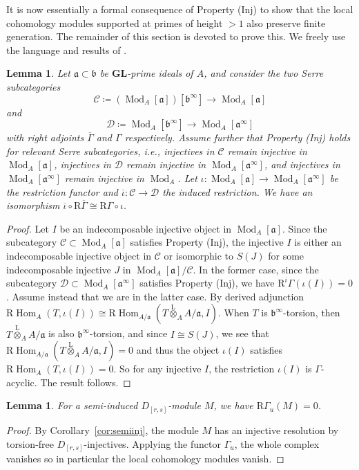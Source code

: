 \documentclass[12pt]{amsart}
\newcommand{\cC}{\mathcal{C}}
\newcommand{\cD}{\mathcal{D}}
\newcommand{\rL}{\mathrm{L}}
\newcommand{\rR}{\mathrm{R}}
\newcommand{\fa}{\mathfrak{a}}
\newcommand{\fb}{\mathfrak{b}}
\DeclareMathOperator{\Hom}{Hom}
\DeclareMathOperator{\Mod}{Mod}
\newcommand{\Drs}{D_{[r,s]}}
\newcommand{\GL}{\mathbf{GL}}
\newcommand{\mGau}{\Gamma_{u}}
\numberwithin{equation}{section}
\newtheorem{lemma}[equation]{Lemma}
\theoremstyle{definition}
\theoremstyle{plain}
\begin{document}
It is now essentially a formal consequence of Property (Inj) to show that the local cohomology modules supported at primes of height $>1$ also preserve finite generation. The remainder of this section is devoted to prove this. We freely use the language and results of \cite[Section~4]{ss19gl2}.
\begin{lemma}\label{lem:restgamma}
    Let $\fa \subset \fb$ be $\GL$-prime ideals of $A$, and consider the two Serre subcategories
    \[  \cC \coloneqq (\Mod_A[\fa])[\fb^{\infty}] \to \Mod_A[\fa] \]
    and
    \[ \cD \coloneqq \Mod_A[\fb^{\infty}] \to \Mod_A[\fa^{\infty}] \] with right adjoints $\overline{\Gamma}$ and $\Gamma$ respectively. Assume further that Property (Inj) holds for relevant Serre subcategories, i.e., injectives in $\cC$ remain injective in $\Mod_A[\fa]$, injectives in $\cD$ remain injective in $\Mod_A[\fa^{\infty}]$, and injectives in $\Mod_A[\fa^{\infty}]$ remain injective in $\Mod_A$. Let $\iota \colon \Mod_A[\fa] \to \Mod_A[\fa^{\infty}]$ be the restriction functor and $\overline\iota \colon \cC \to \cD$ the induced restriction. We have an isomorphism $\overline\iota \circ \rR\overline\Gamma \cong \rR \Gamma \circ \iota$.
\end{lemma}
\begin{proof} 
    Let $I$ be an indecomposable injective object in $\Mod_A[\fa]$. Since the subcategory $\cC \subset \Mod_A[\fa]$ satisfies Property (Inj), the injective $I$ is either an indecomposable injective object in $\cC$ or isomorphic to $S(J)$ for some indecomposable injective $J$ in $\Mod_A[\fa]/\cC$. In the former case, since the subcategory $\cD \subset \Mod_A[\fa^{\infty}]$ satisfies Property (Inj), we have $\rR^i \Gamma(\iota(I)) = 0$. Assume instead that we are in the latter case. By derived adjunction $\rR \Hom_{A}(T, \iota(I)) \cong \rR \Hom_{A/\fa}(T \stackrel{\rL}{\otimes}_A A/\fa, I) $.  When $T$ is $\fb^{\infty}$-torsion, then $T \stackrel{\rL}{\otimes}_A  A/\fa$ is also $\fb^{\infty}$-torsion, and since $I \cong S(J)$, we see that $\rR \Hom_{A/\fa}(T \stackrel{\rL}{\otimes}_A A/\fa, I) = 0$ and thus the object $\iota(I)$ satisfies $\rR\Hom_{A}(T, \iota(I)) = 0$. So for any injective $I$, the restriction $\iota(I)$ is $\Gamma$-acyclic. The result follows.
\end{proof}
\begin{lemma}\label{lem:semilcvan}
   For a semi-induced $\Drs$-module $M$, we have $\rR \mGau(M) = 0$. 
\end{lemma}
\begin{proof}
   By Corollary~\ref{cor:semiinj}, the module $M$ has an injective resolution by torsion-free $\Drs$-injectives. Applying the functor $\mGau$, the whole complex vanishes so in particular the local cohomology modules vanish.
\end{proof}
\end{document}

